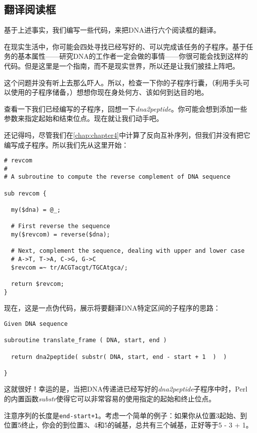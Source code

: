 \subsection{翻译阅读框}
基于上述事实，我们编写一些代码，来把DNA进行六个阅读框的翻译。

在现实生活中，你可能会四处寻找已经写好的、可以完成该任务的子程序。基于任务的基本属性——研究DNA的工作者一定会做的事情——你很可能会找到这样的代码。但是这里是一个指南，而不是现实世界，所以还是让我们披挂上阵吧。

这个问题并没有听上去那么吓人。所以，检查一下你的子程序行囊，（利用手头可以使用的子程序储备，）想想你现在身处何方、该如何到达目的地。

查看一下我们已经编写的子程序，回想一下\textit{dna2peptide}。你可能会想到添加一些参数来指定起始和结束位点。现在就让我们动手吧。

还记得吗，尽管我们在\autoref{chap:chapter4}中计算了反向互补序列，但我们并没有把它编写成子程序。所以我们先从这里开始：

\begin{lstlisting}
# revcom 
#
# A subroutine to compute the reverse complement of DNA sequence

sub revcom {

  my($dna) = @_;

  # First reverse the sequence
  my($revcom) = reverse($dna);

  # Next, complement the sequence, dealing with upper and lower case
  # A->T, T->A, C->G, G->C
  $revcom =~ tr/ACGTacgt/TGCAtgca/;

  return $revcom;
}
\end{lstlisting}

现在，这是一点伪代码，展示将要翻译DNA特定区间的子程序的思路：

\begin{lstlisting}
Given DNA sequence

subroutine translate_frame ( DNA, start, end )

  return dna2peptide( substr( DNA, start, end - start + 1  )  )

}
\end{lstlisting}

这就很好！幸运的是，当把DNA传递进已经写好的\textit{dna2peptide}子程序中时，Perl的内置函数\textit{substr}使得它可以非常容易的使用指定的起始和终止位点。

注意序列的长度是\verb|end-start+1|。考虑一个简单的例子：如果你从位置3起始、到位置5终止，你会的到位置3、4和5的碱基，总共有三个碱基，正好等于5 - 3 + 1。

